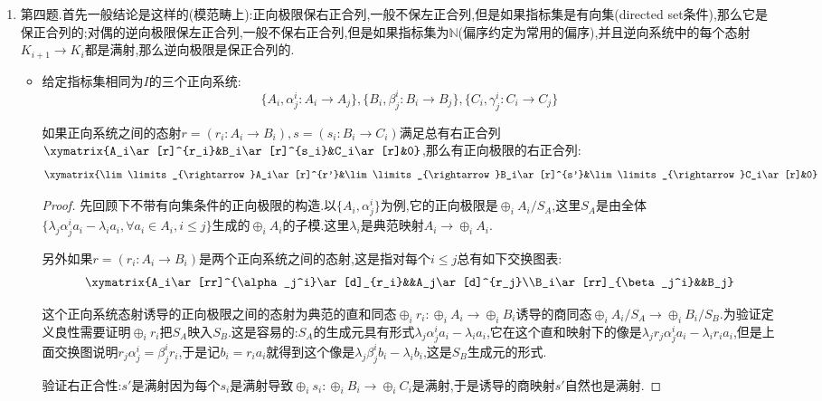 \begin{enumerate}
\begin{proof}
		必要性.这里$Y$是$T_0$的用处只在于$Y$上恰有一个一般点.我们有$f(X)=f(\overline{\{\xi\}})\subset\overline{f(\xi)}$,于是有$Y=\overline{f(X)}\subset\overline{f(\xi)}$,这迫使$f(\xi)=\eta$.
	\end{proof}
	\item 第四题.首先一般结论是这样的(模范畴上):正向极限保右正合列,一般不保左正合列,但是如果指标集是有向集(directed set条件),那么它是保正合列的;对偶的逆向极限保左正合列,一般不保右正合列,但是如果指标集为$\mathbb{N}$(偏序约定为常用的偏序),并且逆向系统中的每个态射$K_{i+1}\to K_i$都是满射,那么逆向极限是保正合列的.
	\begin{itemize}
		\item 给定指标集相同为$I$的三个正向系统:
		$$\{A_i,\alpha_j^i:A_i\to A_j\},\{B_i,\beta_j^i:B_i\to B_j\},\{C_i,\gamma_j^i:C_i\to C_j\}$$
		
		如果正向系统之间的态射$r=(r_i:A_i\to B_i),s=(s_i:B_i\to C_i)$满足总有右正合列$\xymatrix{A_i\ar[r]^{r_i}&B_i\ar[r]^{s_i}&C_i\ar[r]&0}$,那么有正向极限的右正合列:
		$$\xymatrix{\lim\limits_{\rightarrow}A_i\ar[r]^{r'}&\lim\limits_{\rightarrow}B_i\ar[r]^{s'}&\lim\limits_{\rightarrow}C_i\ar[r]&0}$$
		\begin{proof}
			
			先回顾下不带有向集条件的正向极限的构造.以$\{A_i,\alpha_j^i\}$为例,它的正向极限是$\oplus_iA_i/S_A$,这里$S_A$是由全体$\{\lambda_j\alpha^i_ja_i-\lambda_ia_i,\forall a_i\in A_i,i\le j\}$生成的$\oplus_iA_i$的子模.这里$\lambda_i$是典范映射$A_i\to\oplus_iA_i$.
			
			另外如果$r=(r_i:A_i\to B_i)$是两个正向系统之间的态射,这是指对每个$i\le j$总有如下交换图表:
			$$\xymatrix{A_i\ar[rr]^{\alpha_j^i}\ar[d]_{r_i}&&A_j\ar[d]^{r_j}\\B_i\ar[rr]_{\beta_j^i}&&B_j}$$
			
			这个正向系统态射诱导的正向极限之间的态射为典范的直和同态$\oplus_ir_i:\oplus_iA_i\to\oplus_iB_i$诱导的商同态$\oplus_iA_i/S_A\to\oplus_iB_i/S_B$.为验证定义良性需要证明$\oplus_ir_i$把$S_A$映入$S_B$.这是容易的:$S_A$的生成元具有形式$\lambda_j\alpha^i_ja_i-\lambda_ia_i$,它在这个直和映射下的像是$\lambda_jr_j\alpha^i_ja_i-\lambda_ir_ia_i$,但是上面交换图说明$r_j\alpha^i_j=\beta_j^ir_i$,于是记$b_i=r_ia_i$就得到这个像是$\lambda_j\beta^i_jb_i-\lambda_ib_i$,这是$S_B$生成元的形式.
			
			验证右正合性:$s'$是满射因为每个$s_i$是满射导致$\oplus_is_i:\oplus_iB_i\to\oplus_iC_i$是满射,于是诱导的商映射$s'$自然也是满射.
			

\end{proof}
\end{itemize}
\end{enumerate}
